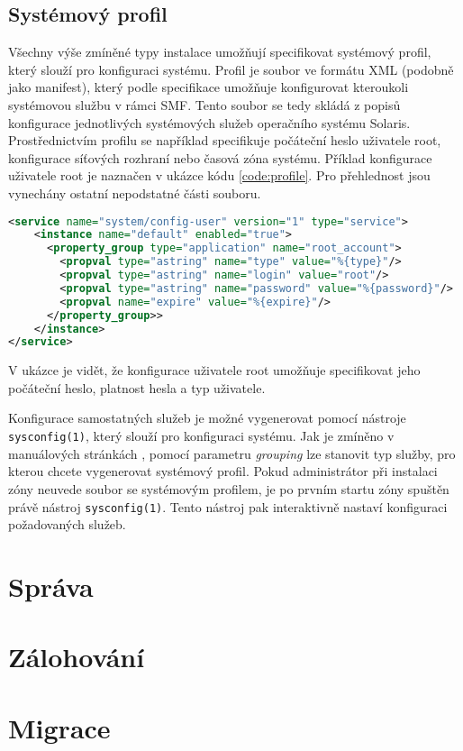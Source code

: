 \subsection{Systémový profil}
\label{chapter:zones:instalation:profile}
Všechny výše zmíněné typy instalace umožňují specifikovat systémový profil, který slouží pro konfiguraci systému. Profil je soubor
ve formátu XML (podobně jako manifest), který podle specifikace \cite{oracle:solaris:zones:profile} umožňuje konfigurovat
kteroukoli systémovou službu v rámci SMF. Tento soubor se tedy skládá z popisů konfigurace jednotlivých systémových služeb
operačního systému Solaris. Prostřednictvím profilu se například specifikuje počáteční heslo uživatele root, konfigurace 
síťových rozhraní nebo časová zóna systému. Příklad konfigurace uživatele root je naznačen v ukázce kódu \ref{code:profile}.
Pro přehlednost jsou vynechány ostatní nepodstatné části souboru.
\begin{lstlisting}[language={XML}, caption={Konfigurace uživatele root}, label={code:profile}]
<service name="system/config-user" version="1" type="service">
    <instance name="default" enabled="true">
      <property_group type="application" name="root_account">
        <propval type="astring" name="type" value="%{type}"/>
        <propval type="astring" name="login" value="root"/>
        <propval type="astring" name="password" value="%{password}"/>
        <propval name="expire" value="%{expire}"/>
      </property_group>>
    </instance>
</service>
\end{lstlisting}
V ukázce je vidět, že konfigurace uživatele root umožňuje specifikovat jeho počáteční heslo, platnost hesla a typ uživatele.

Konfigurace samostatných služeb je možné vygenerovat pomocí nástroje \verb|sysconfig(1)|, který slouží pro konfiguraci systému.
Jak je zmíněno v manuálových stránkách \cite{oracle:manpages:sysconfig}, pomocí parametru \textit{grouping} lze stanovit typ
služby, pro kterou chcete vygenerovat systémový profil. Pokud administrátor při instalaci zóny neuvede soubor se systémovým
profilem, je po prvním startu zóny spuštěn právě nástroj \verb|sysconfig(1)|. Tento nástroj pak interaktivně nastaví konfiguraci
požadovaných služeb.
\section{Správa}
\label{chapter:zones:instalation}
\section{Zálohování}
\label{chapter:zones:backup}
\section{Migrace}
\label{chapter:zones:backup}